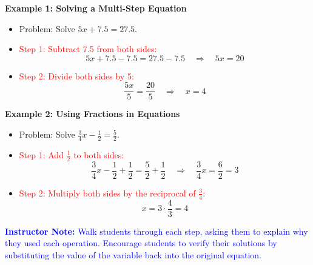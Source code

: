 \documentclass[12pt]{article}
\begin{document}
\vspace{1em}

\begin{tcolorbox}[colframe=black!60, colback=white, 
coltitle=black, colbacktitle=black!15, fonttitle=\bfseries\Large, 
title=Examples, halign title=center, left=10pt, right=10pt, top=10pt, bottom=15pt]
\textbf{Example 1: Solving a Multi-Step Equation}
\begin{itemize}
    \item Problem: Solve \( 5x + 7.5 = 27.5 \).
    \item \textcolor{red}{Step 1: Subtract 7.5 from both sides:}
    \[
    5x + 7.5 - 7.5 = 27.5 - 7.5 \quad \Rightarrow \quad 5x = 20
    \]
    \item \textcolor{red}{Step 2: Divide both sides by 5:}
    \[
    \frac{5x}{5} = \frac{20}{5} \quad \Rightarrow \quad x = 4
    \]
\end{itemize}

\textbf{Example 2: Using Fractions in Equations}
\begin{itemize}
    \item Problem: Solve \( \frac{3}{4}x - \frac{1}{2} = \frac{5}{2} \).
    \item \textcolor{red}{Step 1: Add \( \frac{1}{2} \) to both sides:}
    \[
    \frac{3}{4}x - \frac{1}{2} + \frac{1}{2} = \frac{5}{2} + \frac{1}{2} \quad \Rightarrow \quad \frac{3}{4}x = \frac{6}{2} = 3
    \]
    \item \textcolor{red}{Step 2: Multiply both sides by the reciprocal of \( \frac{3}{4} \):}
    \[
    x = 3 \cdot \frac{4}{3} = 4
    \]
\end{itemize}

\textcolor{blue}{\textbf{Instructor Note:} Walk students through each step, asking them to explain why they used each operation. Encourage students to verify their solutions by substituting the value of the variable back into the original equation.}
\end{tcolorbox}

\vspace{1em}
\end{document}
